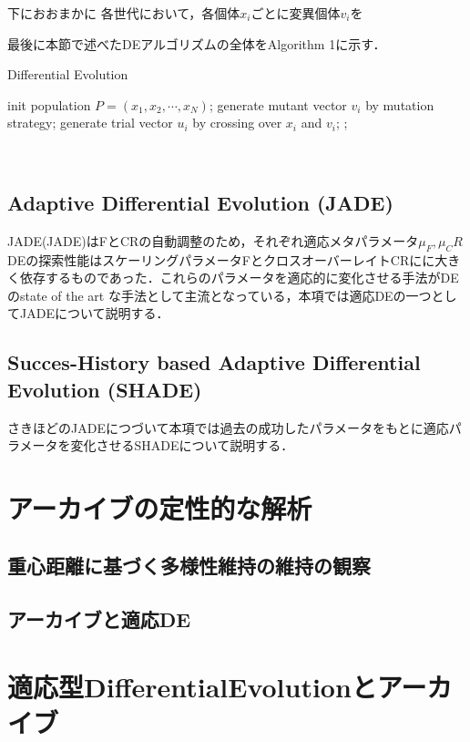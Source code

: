 \documentclass[a4paper,11pt,oneside,openany]{jsbook}
\begin{document}
下におおまかに
各世代において，各個体${x_i}$ごとに変異個体${v_i}$を

最後に本節で述べたDEアルゴリズムの全体をAlgorithm 1に示す．
\begin{algorithm}                      
\caption{Differential Evolution}         
\label{alg:pbnf}                          
\begin{algorithmic}  
\STATE init population ${P} = (x_1, x_2, \cdots, x_N)$;
        \STATE generate mutant vector {$v_i$} by mutation strategy;
        \STATE generate trial vector {$u_i$} by crossing over {$x_i$} and {$v_i$}; 
    \ENDFOR
            ;
        \ENDIF
    \ENDFOR
\ENDWHILE
\end{algorithmic}
\end{algorithm}　　　　　　　　　　　　　　　　　　　　　


\section{Adaptive Differential Evolution (JADE)}
JADE\quote(JADE)はFとCRの自動調整のため，それぞれ適応メタパラメータ$\mu _F,\mu _CR$
DEの探索性能はスケーリングパラメータFとクロスオーバーレイトCRにに大きく依存するものであった．これらのパラメータを適応的に変化させる手法がDEのstate of the art な手法として主流となっている，本項では適応DEの一つとしてJADEについて説明する．
\section{Succes-History based Adaptive Differential Evolution (SHADE)}
さきほどのJADEにつづいて本項では過去の成功したパラメータをもとに適応パラメータを変化させるSHADEについて説明する．

\chapter{アーカイブの定性的な解析}
\section{重心距離に基づく多様性維持の維持の観察}
\section{アーカイブと適応DE}
\chapter{適応型DifferentialEvolutionとアーカイブ}
\end{document}

